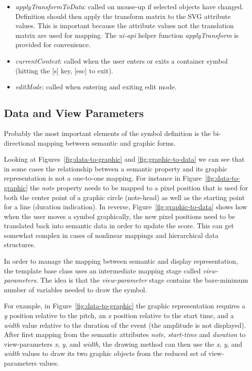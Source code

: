 \documentclass{article}
\def\uiapi{\textit{ui-api}\xspace}
\begin{document}
\begin{itemize}
\item \textit{applyTransformToData}: called on mouse-up if selected objects have changed. Definition should then apply the transform matrix to the SVG attribute values. This is important because the attribute values not the translation matrix are used for mapping. The \uiapi helper function \textit{applyTransform} is provided for convenience.

\item \textit{currentContext}: called when the user enters or exits a container symbol (hitting the [s] key, [esc] to exit).

\item \textit{editMode}: called when entering and exiting edit mode.
\end{itemize}

\subsection{Data and View Parameters}\label{sec:view-parameters}

Probably the most important elements of the symbol definition is the bi-directional mapping between semantic and graphic forms.
 
Looking at Figures~\ref{fig:data-to-graphic} and \ref{fig:graphic-to-data} we can see that in some cases the relationship between a semantic property and its graphic representation is not a one-to-one mapping.
For instance in Figure~\ref{fig:data-to-graphic} the \textit{note} property needs to be mapped to a pixel position that is used for both the center point of a graphic circle (note-head) as well as the starting point for a line (duration indication).
In reverse, Figure~\ref{fig:graphic-to-data} shows how when the user moves a symbol graphically, the new pixel positions need to be translated back into semantic data in order to update the score.
This can get somewhat complex in cases of nonlinear mappings and hierarchical data structures.

In order to manage the mapping between semantic and display representation, the template base class uses an intermediate mapping stage called \textit{view-parameters}.
The idea is that the \textit{view-parameter} stage contains the bare-minimum number of variables needed to draw the symbol.

For example, in Figure~\ref{fig:data-to-graphic} the graphic representation requires a \textit{y} position relative to the pitch, an \textit{x} position relative to the start time, and a \textit{width} value relative to the duration of the event (the amplitude is not displayed).
After first mapping from the semantic attributes \textit{note}, \textit{start-time} and \textit{duration} to view-parameters \textit{x}, \textit{y}, and \textit{width}, the drawing method can then use the \textit{x}, \textit{y}, and \textit{width} values to draw its two graphic objects from the reduced set of view-parameters values.
\end{document}
